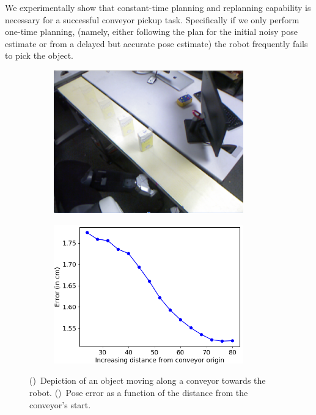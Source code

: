 \documentclass[conference]{IEEEtran}
\begin{document}
%
We experimentally show that constant-time planning and replanning capability is necessary for a successful conveyor pickup task. Specifically if we only perform one-time planning, (namely, either following the plan for the initial noisy pose estimate or from a delayed but accurate pose estimate) the robot frequently fails to pick the object.
\begin{figure}[t]
    \centering
    \begin{subfigure}{.225\textwidth}
        \includegraphics[width=0.9\textwidth]{object_blur}
        \caption{}
        \label{fig:obj1}
    \end{subfigure}
    \begin{subfigure}{0.225\textwidth}
        \includegraphics[width=0.9\textwidth]{pose_error_f}
        \caption{}
        \label{fig:obj2}
    \end{subfigure}
    \caption{
    \CaptionTextSize
    ()~Depiction of an object moving along a conveyor towards the robot.
    ()~Pose error as a function of the distance from the conveyor's start.
    }
    \label{fig:pose_sequence}
\end{figure}
\end{document}
